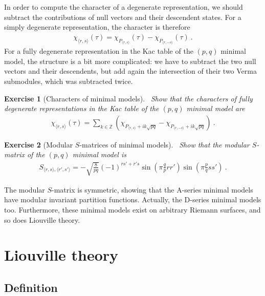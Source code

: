 \documentclass[12pt, a4paper]{article}
\theoremstyle{break}
\newtheorem{exo}{Exercise}[section]
\begin{document}
In order to compute the character of a degenerate representation, we should subtract the contributions of null vectors and their descendent states. For a simply degenerate representation, the character is therefore
\begin{align}
 \chi_{\langle r,s\rangle}(\tau) = \chi_{P_{\langle r,s\rangle}}(\tau) - \chi_{P_{\langle r,-s\rangle}}(\tau)\ .
\end{align}
For a fully degenerate representation in the Kac table of the $(p, q)$ minimal model, the structure is a bit more complicated: we have to subtract the two null vectors and their descendents, but add again the intersection of their two Verma submodules, which was subtracted twice. 

\begin{exo}[Characters of minimal models]
 ~\label{exo:chmm}
 Show that the characters of fully degenerate representations in the Kac table of the $(p, q)$ minimal model are
 \begin{align}
 \chi_{\langle r,s\rangle}(\tau) = \sum_{k\in\mathbb{Z}} \left( \chi_{P_{\langle r,s\rangle} + ik\sqrt{pq}} - \chi_{P_{\langle r,-s\rangle} + ik\sqrt{pq}}\right)\ .
 \label{eq:chmm}
\end{align}
\end{exo}

\begin{exo}[Modular $S$-matrices of minimal models]
~\label{exo:mods}
 Show that the modular $S$-matrix of the $(p, q)$ minimal model is 
 \begin{align}
 S_{\langle r,s\rangle, \langle r', s'\rangle} = -\sqrt{\frac{8}{pq}}(-1)^{rs'+r's} \sin\left(\pi\frac{q}{p}rr'\right)\sin\left(\pi\frac{p}{q}ss'\right)\ .
 \label{eq:smm}
\end{align}
\end{exo}
The modular $S$-matrix is symmetric, showing that the A-series minimal models have modular invariant partition functions. Actually, the D-series minimal models too. Furthermore, these minimal models exist on arbitrary Riemann surfaces, and so does Liouville theory.

\section{Liouville theory}

\subsection{Definition}
\end{document}
